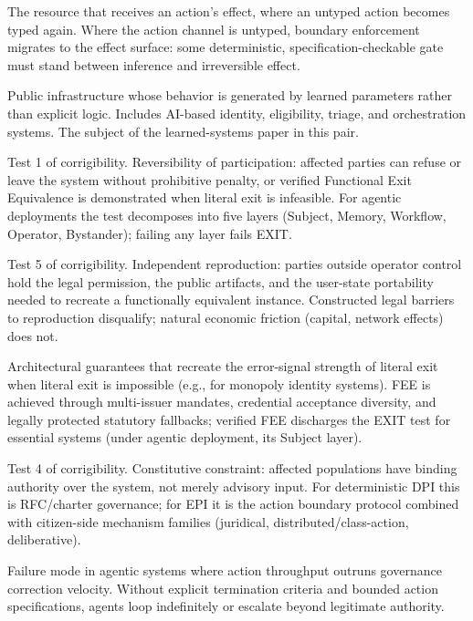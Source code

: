 \begin{description}[style=nextline, leftmargin=1.5em, font=\normalfont\bfseries]
The resource that receives an action's effect, where an untyped action
becomes typed again. Where the action channel is untyped, boundary
enforcement migrates to the effect surface: some deterministic,
specification-checkable gate must stand between inference and
irreversible effect.

Public infrastructure whose behavior is generated by learned
parameters rather than explicit logic. Includes AI-based identity,
eligibility, triage, and orchestration systems. The subject of the
learned-systems paper in this pair.

Test 1 of corrigibility. Reversibility of participation: affected
parties can refuse or leave the system without prohibitive penalty, or
verified Functional Exit Equivalence is demonstrated when literal exit
is infeasible. For agentic deployments the test decomposes into five
layers (Subject, Memory, Workflow, Operator, Bystander); failing any
layer fails EXIT.

Test 5 of corrigibility. Independent reproduction: parties outside
operator control hold the legal permission, the public artifacts, and
the user-state portability needed to recreate a functionally
equivalent instance. Constructed legal barriers to reproduction
disqualify; natural economic friction (capital, network effects) does
not.

Architectural guarantees that recreate the error-signal strength of
literal exit when literal exit is impossible (e.g., for monopoly
identity systems). FEE is achieved through multi-issuer mandates,
credential acceptance diversity, and legally protected statutory
fallbacks; verified FEE discharges the EXIT test for essential
systems (under agentic deployment, its Subject layer).

Test 4 of corrigibility. Constitutive constraint: affected populations
have binding authority over the system, not merely advisory input.
For deterministic DPI this is RFC/charter governance; for EPI it is
the action boundary protocol combined with citizen-side mechanism
families (juridical, distributed/class-action, deliberative).

Failure mode in agentic systems where action throughput outruns
governance correction velocity. Without explicit termination criteria
and bounded action specifications, agents loop indefinitely or
escalate beyond legitimate authority.


\end{description}
